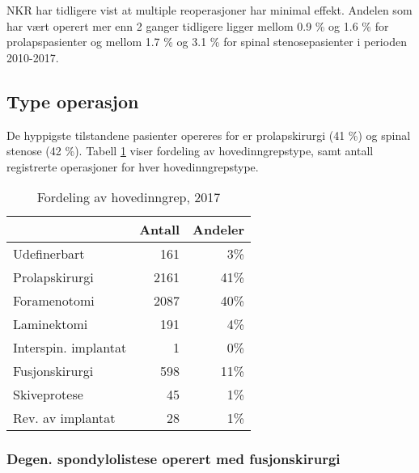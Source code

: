 \documentclass [norsk,a4paper,twoside]{article}\usepackage[]{graphicx}\usepackage[]{color}
\begin{document}
NKR har tidligere vist at multiple reoperasjoner har minimal effekt. Andelen som har vært operert mer enn 2 ganger tidligere ligger mellom 0.9 \%
og 1.6 \% for prolapspasienter og mellom 1.7 \%
og 3.1 \% for spinal stenosepasienter i perioden 2010-2017. 



\subsection{Type operasjon}



De hyppigste tilstandene pasienter opereres for er prolapskirurgi (41 \%) og spinal stenose (42 \%). Tabell \ref{tab:AntHovedInngrep} viser fordeling av hovedinngrepstype, samt antall registrerte operasjoner for hver hovedinngrepstype.

\begin{table}[ht]
\centering
\begin{tabular}{lrr}
  \hline
 & Antall & Andeler \\ 
  \hline
Udefinerbart & 161 & 3\% \\ 
  Prolapskirurgi & 2161 & 41\% \\ 
  Foramenotomi & 2087 & 40\% \\ 
  Laminektomi & 191 & 4\% \\ 
  Interspin. implantat & 1 & 0\% \\ 
  Fusjonskirurgi & 598 & 11\% \\ 
  Skiveprotese & 45 & 1\% \\ 
  Rev. av implantat & 28 & 1\% \\ 
   \hline
\end{tabular}
\caption{Fordeling av hovedinngrep, 2017} 
\label{tab:AntHovedInngrep}
\end{table}






\subsubsection{Degen. spondylolistese operert med fusjonskirurgi}
\end{document}
